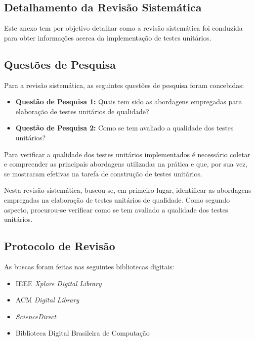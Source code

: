 \begin{anexosenv}

\partanexos

\chapter{Detalhamento da Revisão Sistemática}

Este anexo tem por objetivo detalhar como a revisão sistemática foi conduzida para obter informações acerca da implementação de testes unitários.

\section{Questões de Pesquisa}

Para a revisão sistemática, as seguintes questões de pesquisa foram concebidas:

\begin{itemize}
	\item \textbf{Questão de Pesquisa 1:} Quais tem sido as abordagens empregadas para elaboração de testes unitários de qualidade?
	\item \textbf{Questão de Pesquisa 2:} Como se tem avaliado a qualidade dos testes unitários?
\end{itemize}

Para verificar a qualidade dos testes unitários implementados é necessário coletar e compreender as principais abordagens utilizadas na prática e que, por sua vez, se mostraram efetivas na tarefa de construção de testes unitários.

Nesta revisão sistemática, buscou-se, em primeiro lugar, identificar as abordagens empregadas na elaboração de testes unitários de qualidade. Como segundo aspecto, procurou-se verificar como se tem avaliado a qualidade dos testes unitários.

\section{Protocolo de Revisão}

As buscas foram feitas nas seguintes bibliotecas digitais:

\begin{itemize}
	\item IEEE \textit{Xplore Digital Library}
	\item ACM \textit{Digital Library}
	\item \textit{ScienceDirect}
	\item Biblioteca Digital Brasileira de Computação
\end{itemize}


\end{anexosenv}
